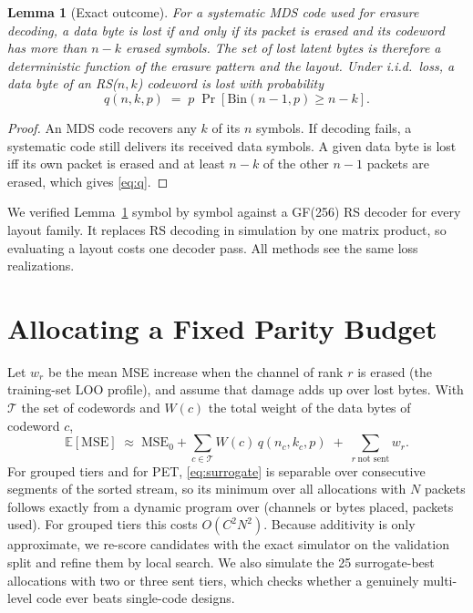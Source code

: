 \documentclass[conference]{IEEEtran}
\newtheorem{lemma}{Lemma}
\begin{document}
\begin{lemma}[Exact outcome]\label{lem:exact}
For a systematic MDS code used for erasure decoding, a data byte is lost if and only if its packet is
erased and its codeword has more than $n-k$ erased symbols. The set of lost latent bytes is therefore a
deterministic function of the erasure pattern and the layout. Under i.i.d.\ loss, a data byte of an
RS($n,k$) codeword is lost with probability
\begin{equation}
q(n,k,p) \;=\; p\;\Pr\!\left[\mathrm{Bin}(n-1,p)\ge n-k\right]. \label{eq:q}
\end{equation}
\end{lemma}
\begin{proof}
An MDS code recovers any $k$ of its $n$ symbols. If decoding fails, a systematic code still delivers its
received data symbols. A given data byte is lost iff its own packet is erased and at least $n-k$ of the
other $n-1$ packets are erased, which gives \eqref{eq:q}.
\end{proof}
We verified Lemma~\ref{lem:exact} symbol by symbol against a GF(256) RS decoder for every layout family.
It replaces RS decoding in simulation by one matrix product, so evaluating a layout costs one decoder
pass. All methods see the same loss realizations.

\section{Allocating a Fixed Parity Budget}
Let $w_r$ be the mean MSE increase when the channel of rank $r$ is erased (the training-set LOO profile),
and assume that damage adds up over lost bytes. With $\mathcal{T}$ the set of codewords and $W(c)$ the
total weight of the data bytes of codeword $c$,
\begin{equation}
\mathbb{E}[\mathrm{MSE}] \;\approx\; \mathrm{MSE}_0 + \sum_{c\in\mathcal{T}} W(c)\, q(n_c,k_c,p)
\;+\; \sum_{r\ \text{not sent}} w_r . \label{eq:surrogate}
\end{equation}
For grouped tiers and for PET, \eqref{eq:surrogate} is separable over consecutive segments of the sorted
stream, so its minimum over all allocations with $N$ packets follows exactly from a dynamic program over
(channels or bytes placed, packets used). For grouped tiers this costs $O(C^2N^2)$. Because additivity is
only approximate, we re-score candidates with the exact simulator on the validation split and refine
them by local search. We also simulate the 25 surrogate-best allocations with two or three sent tiers,
which checks whether a genuinely multi-level code ever beats single-code designs.
\end{document}
